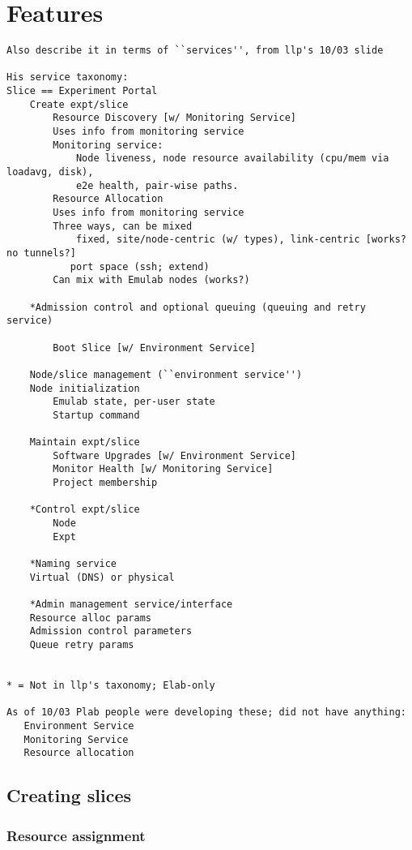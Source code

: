 \section{Features}
\label{features}

\small{
\begin{verbatim}
Also describe it in terms of ``services'', from llp's 10/03 slide

His service taxonomy:
Slice == Experiment Portal
    Create expt/slice
        Resource Discovery [w/ Monitoring Service]
		Uses info from monitoring service
		Monitoring service:
			Node liveness, node resource availability (cpu/mem via loadavg, disk),
			e2e health, pair-wise paths.
        Resource Allocation
		Uses info from monitoring service
		Three ways, can be mixed
			fixed, site/node-centric (w/ types), link-centric [works?  no tunnels?]
		   port space (ssh; extend)
		Can mix with Emulab nodes (works?)

	*Admission control and optional queuing (queuing and retry service)

        Boot Slice [w/ Environment Service]

    Node/slice management (``environment service'')
	Node initialization
		Emulab state, per-user state
		Startup command

    Maintain expt/slice
        Software Upgrades [w/ Environment Service]
        Monitor Health [w/ Monitoring Service]
        Project membership

    *Control expt/slice
        Node 
        Expt

    *Naming service
	Virtual (DNS) or physical

    *Admin management service/interface
	Resource alloc params
	Admission control parameters
	Queue retry params


* = Not in llp's taxonomy; Elab-only

As of 10/03 Plab people were developing these; did not have anything:
   Environment Service
   Monitoring Service
   Resource allocation
\end{verbatim}
}%



\subsection{Creating slices}

\subsubsection{Resource assignment}

